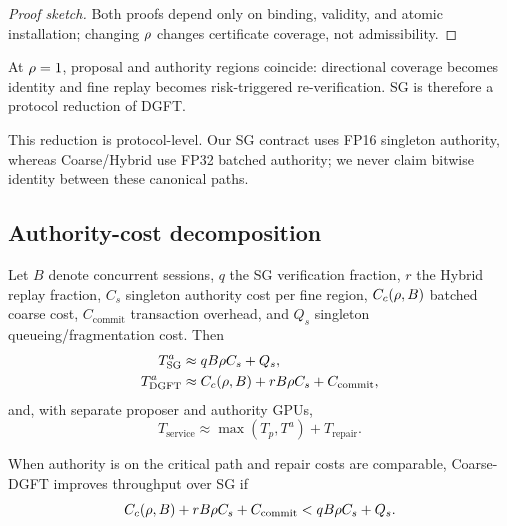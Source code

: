 \begin{proof}[Proof sketch]
Both proofs depend only on binding, validity, and atomic installation; changing
$\rho$ changes certificate coverage, not admissibility.
\end{proof}

\begin{corollary}[Same-granularity certification as $\granratio=1$]\label{cor:sg}
At $\granratio=1$, proposal and authority regions coincide: directional
coverage becomes identity and fine replay becomes risk-triggered
re-verification. SG is therefore a protocol reduction of DGFT.
\end{corollary}

\begin{remark}\label{rem:canonical}
This reduction is protocol-level. Our SG contract uses FP16 singleton
authority, whereas Coarse/Hybrid use FP32 batched authority; we never claim
bitwise identity between these canonical paths.
\end{remark}

\subsection{Authority-cost decomposition}\label{sec:dgft:cost}

Let $B$ denote concurrent sessions, $q$ the SG verification fraction, $r$ the
Hybrid replay fraction, $C_s$ singleton authority cost per fine region,
$C_c(\rho,B)$ batched coarse cost, $C_{\mathrm{commit}}$ transaction
overhead, and $Q_s$ singleton queueing/fragmentation cost. Then
\begin{align}
 T_{\mathrm{SG}}^a&\approx qB\rho C_s+Q_s,\label{eq:cost-sg}\\
 T_{\mathrm{DGFT}}^a&\approx C_c(\rho,B)+rB\rho C_s+
 C_{\mathrm{commit}},\label{eq:cost-dgft}
\end{align}
and, with separate proposer and authority GPUs,
\begin{equation}\label{eq:cost-service}
 T_{\mathrm{service}}\approx\max(T_p,T^a)+T_{\mathrm{repair}}.
\end{equation}

\begin{proposition}\label{prop:coarse}
When authority is on the critical path and repair costs are comparable,
Coarse-DGFT improves throughput over SG if
\[
 C_c(\rho,B)+rB\rho C_s+C_{\mathrm{commit}}
 <qB\rho C_s+Q_s.
\]
\end{proposition}

